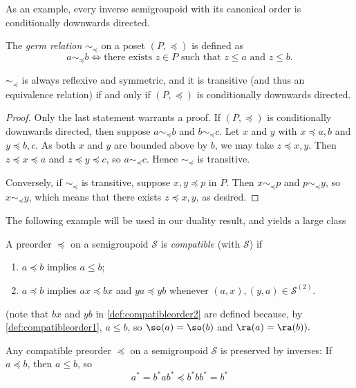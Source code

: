 As an example, every inverse semigroupoid with its canonical order is conditionally downwards directed.

The \emph{germ relation} $\sim_{\preceq}$ on a poset $(P,\preceq)$ is defined as
\[a\sim_{\preceq} b\iff\text{there exists }z\in P\text{ such that } z\leq a\text{ and }z\leq b.\]

\begin{lemma}
$\sim_\preceq$ is always reflexive and symmetric, and it is transitive (and thus an equivalence relation) if and only if $(P,\preceq)$ is conditionally downwards directed.
\end{lemma}
\begin{proof}
    Only the last statement warrants a proof. If $(P,\preceq)$ is conditionally downwards directed, then suppose $a\sim_{\preceq} b$ and $b\sim_{\preceq} c$. Let $x$ and $y$ with $x\preceq a,b$ and $y\preceq b,c$. As both $x$ and $y$ are bounded above by $b$, we may take $z\preceq x,y$. Then $z\preceq x\preceq a$ and $z\preceq y\preceq c$, so $a\sim_\preceq c$. Hence $\sim_\preceq$ is transitive.
    
    Conversely, if $\sim_\preceq$ is transitive, suppose $x,y\preceq p$ in $P$. Then $x\sim_\preceq p$ and $p\sim_\preceq y$, so $x\sim_\preceq y$, which means that there exists $z\preceq x,y$, as desired.\qedhere
\end{proof}

The following example will be used in our duality result, and yields a large class 

\begin{definition}\label{def:compatibleorder}
    A preorder $\preceq$ on a semigroupoid $\mathcal{S}$ is \emph{compatible} (with $\mathcal{S}$) if
    \begin{enumerate}[label=(\roman*)]
        \item\label{def:compatibleorder1} $a\preceq b$ implies $a\leq b$;
        \item\label{def:compatibleorder2} $a\preceq b$ implies $ax\preceq bx$ and $ya\preceq yb$ whenever $(a,x),(y,a)\in\mathcal{S}^{(2)}$.
    \end{enumerate}
    (note that $bx$ and $yb$ in \ref{def:compatibleorder2} are defined because, by \ref{def:compatibleorder1}, $a\leq b$, so $\so(a)=\so(b)$ and $\ra(a)=\ra(b)).$
\end{definition}

Any compatible preorder $\preceq$ on a semigroupoid $\mathcal{S}$ is preserved by inverses: If $a\preceq b$, then $a\leq b$, so
\[a^*=b^*ab^*\preceq b^*bb^*=b^*\]

